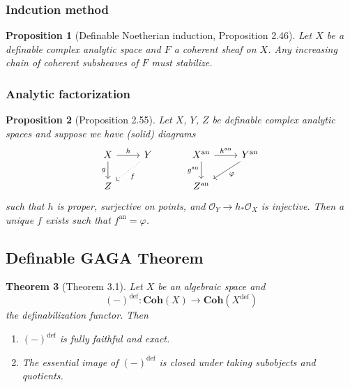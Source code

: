 \documentclass{amsart}
\newtheorem{theorem}{Theorem}[subsection]
\newtheorem{proposition}[theorem]{Proposition}
\theoremstyle{definition}
\numberwithin{equation}{section}
\newcommand{\definable}{\mathrm{def}}
\newcommand{\analytic}{\mathrm{an}}
\begin{document}
\subsubsection{Indcution method}
\begin{proposition}[Definable Noetherian induction, Proposition 2.46]
    Let $X$ be a definable complex analytic space and $F$ a coherent sheaf on $X$. 
    Any increasing chain of coherent subsheaves of $F$ must stabilize.
\end{proposition}

\subsubsection{Analytic factorization}
\begin{proposition}[Proposition 2.55]
    Let $X$, $Y$, $Z$ be definable complex analytic spaces and
    suppose we have (solid) diagrams
    \[
    \begin{tikzcd}
        X \ar[r,"h"] \ar[d,"g"'] & Y\ar[dl,"f",dotted] \\ Z 
    \end{tikzcd}
    \hspace*{30pt}
    \begin{tikzcd}
        X^{\analytic} \ar[r,"h^{\analytic}"] \ar[d,"g^{\analytic}"'] & Y^{\analytic}\ar[dl,"\varphi"] \\ Z^{\analytic}
    \end{tikzcd}
    \]
    such that $h$ is proper, surjective on points,
    and $\mathcal{O}_Y \to h_*\mathcal{O}_X$ is injective.
    Then a unique $f$ exists such that $f^{\analytic} = \varphi$.
\end{proposition}

\subsection{Definable GAGA Theorem}

\begin{theorem}[Theorem 3.1]
    \label{def GAGA}
    Let $X$ be an algebraic space and
    \[(-)^{\definable} : \mathbf{Coh}(X) \to \mathbf{Coh}(X^{\definable})\]
    the definabilization functor.
    Then 
    \begin{enumerate}[label = {(\arabic*)}]
        \item $(-)^{\definable}$ is fully faithful and exact.
        \item The essential image of $(-)^{\definable}$ is closed under taking subobjects and quotients.
    \end{enumerate}
\end{theorem}
\end{document}
